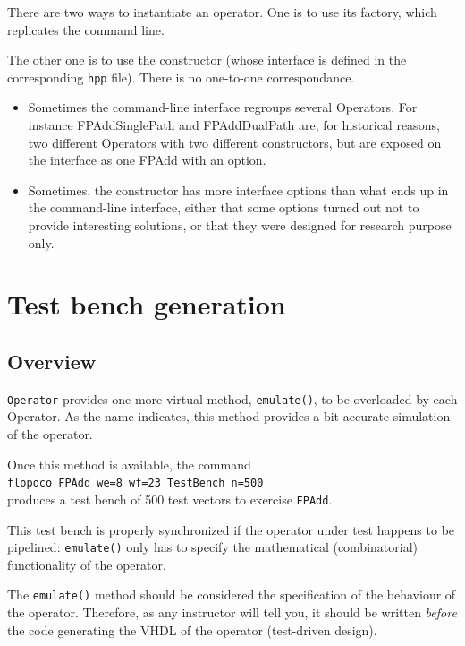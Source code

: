 \documentclass{article}
\begin{document}
There are two ways to instantiate an operator.
One is to use its factory, which replicates the command line.

The other one is to use the constructor (whose interface is defined in the corresponding \texttt{hpp} file).
There is no one-to-one correspondance.
\begin{itemize}
\item Sometimes the command-line interface regroups several Operators.
  For instance FPAddSinglePath and FPAddDualPath are, for historical reasons, two different Operators with two different constructors, but are exposed on the interface as one FPAdd with an option.
  
\item Sometimes, the constructor has more interface options than what ends up in the command-line interface, either that some options turned out not to provide interesting solutions, or that they were
  designed for research purpose only.
\end{itemize}

\section{Test bench generation}\label{sec:test-bench-gener}

\subsection{Overview}
\texttt{\small Operator} provides one more virtual method, \texttt{\small emulate()},
to be overloaded by each Operator. As the name indicates, this method
provides a bit-accurate simulation of the operator.
 
Once this method is available, the command\\
 \texttt{flopoco FPAdd we=8 wf=23 TestBench n=500} \\
produces a test bench of 500 test vectors to exercise \texttt{\small FPAdd}. 

This test bench is properly synchronized if the operator under test happens to be pipelined: \texttt{\small emulate()} only has to specify the mathematical (combinatorial) functionality of the operator.

The \texttt{\small emulate()} method should be considered  the specification of the behaviour of the operator.
Therefore, as any instructor will tell you, it should be written \emph{before} the code generating the VHDL of the operator (test-driven design).
\end{document}
